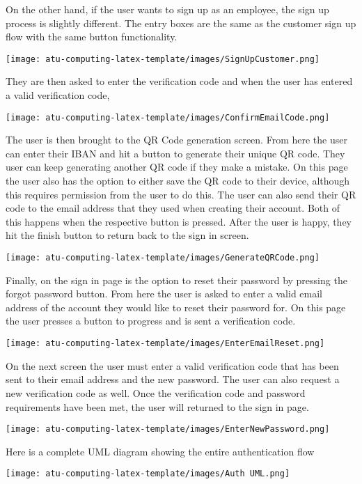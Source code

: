 On the other hand, if the user wants to sign up as an employee, the sign up process is slightly different. The entry boxes are the same as the customer sign up flow with the same button functionality. 
\begin{center}
\texttt{[image: atu-computing-latex-template/images/SignUpCustomer.png]}
\end{center}
They are then asked to enter the verification code and when the user has entered a valid verification code,
\begin{center}
\texttt{[image: atu-computing-latex-template/images/ConfirmEmailCode.png]}
\end{center}
The user is then brought to the QR Code generation screen. From here the user can enter their IBAN and hit a button to generate their unique QR code. They user can keep generating another QR code if they make a mistake. On this page the user also has the option to either save the QR code to their device, although this requires permission from the user to do this. The user can also send their QR code to the email address that they used when creating their account. Both of this happens when the respective button is pressed. After the user is happy, they hit the finish button to return back to the sign in screen. 
\begin{center}
\texttt{[image: atu-computing-latex-template/images/GenerateQRCode.png]}
\end{center}
Finally, on the sign in page is the option to reset their password by pressing the forgot password button. From here the user is asked to enter a valid email address of the account they would like to reset their password for. On this page the user presses a button to progress and is sent a verification code. 
\begin{center}
\texttt{[image: atu-computing-latex-template/images/EnterEmailReset.png]}
\end{center}
On the next screen the user must enter a valid verification code that has been sent to their email address and the new password. The user can also request a new verification code as well. Once the verification code and password requirements have been met, the user will returned to the sign in page.
\begin{center}
\texttt{[image: atu-computing-latex-template/images/EnterNewPassword.png]}
\end{center}
Here is a complete UML diagram showing the entire authentication flow
\begin{center}
\texttt{[image: atu-computing-latex-template/images/Auth UML.png]}
\end{center}

